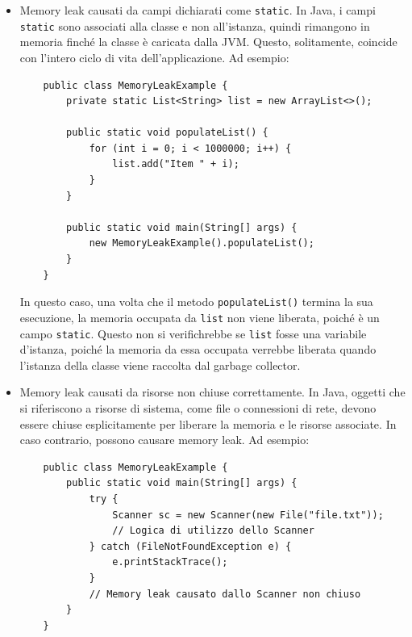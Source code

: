 \begin{itemize}
    \item Memory leak causati da campi dichiarati come \texttt{static}. In Java, i campi \texttt{static} sono associati alla classe e non all'istanza, quindi rimangono in memoria finché la classe è caricata dalla JVM. Questo, solitamente, coincide con l'intero ciclo di vita dell'applicazione. Ad esempio: 
    \begin{verbatim}
    public class MemoryLeakExample {
        private static List<String> list = new ArrayList<>();

        public static void populateList() {
            for (int i = 0; i < 1000000; i++) {
                list.add("Item " + i);
            }
        }

        public static void main(String[] args) {
            new MemoryLeakExample().populateList();
        }
    }
    \end{verbatim}
    In questo caso, una volta che il metodo \texttt{populateList()} termina la sua esecuzione, la memoria occupata da \texttt{list} non viene liberata, poiché è un campo \texttt{static}. Questo non si verifichrebbe se \texttt{list} fosse una variabile d'istanza, poiché la memoria da essa occupata verrebbe liberata quando l'istanza della classe viene raccolta dal garbage collector.
    \item Memory leak causati da risorse non chiuse correttamente. In Java, oggetti che si riferiscono a risorse di sistema, come file o connessioni di rete, devono essere chiuse esplicitamente per liberare la memoria e le risorse associate. In caso contrario, possono causare memory leak. Ad esempio:
    \begin{verbatim}
    public class MemoryLeakExample {
        public static void main(String[] args) {
            try {
                Scanner sc = new Scanner(new File("file.txt"));
                // Logica di utilizzo dello Scanner
            } catch (FileNotFoundException e) {
                e.printStackTrace();
            }
            // Memory leak causato dallo Scanner non chiuso
        }
    }
    \end{verbatim}
\end{itemize}

